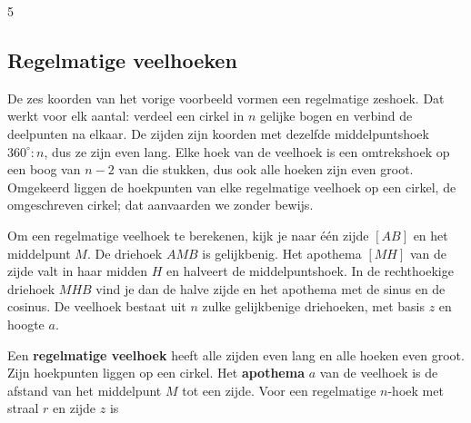 \begin{oefeningen}
\end{oefeningen}

\begin{alleenvoor}{5}
\subsection{Regelmatige veelhoeken}

De zes koorden van het vorige voorbeeld vormen een regelmatige zeshoek. Dat werkt voor elk aantal: verdeel een cirkel in $n$ gelijke bogen en verbind de deelpunten na elkaar. De zijden zijn koorden met dezelfde middelpuntshoek $360^\circ : n$, dus ze zijn even lang. Elke hoek van de veelhoek is een omtrekshoek op een boog van $n - 2$ van die stukken, dus ook alle hoeken zijn even groot. Omgekeerd liggen de hoekpunten van elke regelmatige veelhoek op een cirkel, de omgeschreven cirkel; dat aanvaarden we zonder bewijs.

Om een regelmatige veelhoek te berekenen, kijk je naar één zijde $[AB]$ en het middelpunt $M$. De driehoek $AMB$ is gelijkbenig. Het apothema $[MH]$ van de zijde valt in haar midden $H$ en halveert de middelpuntshoek. In de rechthoekige driehoek $MHB$ vind je dan de halve zijde en het apothema met de sinus en de cosinus. De veelhoek bestaat uit $n$ zulke gelijkbenige driehoeken, met basis $z$ en hoogte $a$.

\begin{theorie}
\begin{minipage}[t]{.66\linewidth}
\vspace{0pt}
Een \textbf{\textcolor{accent}{regelmatige veelhoek}} heeft alle zijden even lang en alle hoeken even groot. Zijn hoekpunten liggen op een cirkel. Het \textbf{\textcolor{accent}{apothema}} $a$ van de veelhoek is de afstand van het middelpunt $M$ tot een zijde. Voor een regelmatige $n$-hoek met straal $r$ en zijde $z$ is


\end{minipage}
\end{theorie}
\end{alleenvoor}
